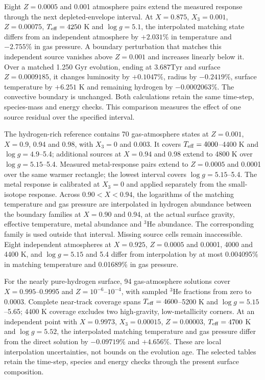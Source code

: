 \documentclass[11pt,letterpaper]{article}
\newcommand{\Tyr}{\mathrm{Tyr}}
\begin{document}
Eight $Z=0.0005$ and 0.001 atmosphere pairs extend the measured response
through the next depleted-envelope interval. At $X=0.875$, $X_3=0.001$,
$Z=0.00075$, $T_{\rm eff}=4250$ K and $\log g=5.1$, the interpolated
matching state differs from an independent atmosphere by $+2.031\%$ in
temperature and $-2.755\%$ in gas pressure. A boundary perturbation that
matches this independent source vanishes above $Z=0.001$ and increases
linearly below it. Over a matched 1.250 Gyr evolution, ending at
$3.687\Tyr$ and surface $Z=0.0009185$, it changes luminosity by
$+0.1047\%$, radius by $-0.2419\%$, surface temperature by $+6.251$ K
and remaining hydrogen by $-0.0002063\%$. The convective boundary is
unchanged. Both calculations retain the same time-step, species-mass and
energy checks. This comparison measures the effect of one source residual
over the specified interval.

The hydrogen-rich reference contains 70 gas-atmosphere states at
$Z=0.001$, $X=0.9$, 0.94 and 0.98, with $X_3=0$ and 0.003.
It covers $T_{\rm eff}=4000$--4400 K and $\log g=4.9$--5.4;
additional sources at $X=0.94$ and 0.98 extend to 4800 K over
$\log g=5.15$--5.4. Measured metal-response pairs extend to
$Z=0.0005$ and 0.0001 over the same warmer rectangle;
the lowest interval covers $\log g=5.15$--5.4. The metal response is
calibrated at $X_3=0$ and applied separately from the small-isotope response.
Across $0.90<X<0.94$, the logarithms of the matching temperature and gas
pressure are interpolated in hydrogen abundance between the boundary
families at $X=0.90$ and 0.94, at the actual surface gravity, effective
temperature, metal abundance and $^3$He abundance. The corresponding
family is used outside that interval. Missing source cells remain
inaccessible. Eight independent atmospheres
at $X=0.925$, $Z=0.0005$ and 0.0001, 4000 and 4400 K, and
$\log g=5.15$ and 5.4 differ from interpolation by at most 0.004095\%
in matching temperature and 0.01689\% in gas pressure.

For the nearly pure-hydrogen surface, 94 gas-atmosphere solutions cover
$X=0.995$--0.9995 and $Z=10^{-6}$--$10^{-4}$, with sampled
$^3$He fractions from zero to 0.0003. Complete near-track coverage spans
$T_{\rm eff}=4600$--5200 K and $\log g=5.15$--5.65;
4400 K coverage excludes two high-gravity, low-metallicity corners.
At an independent point with $X=0.9973$, $X_3=0.00015$, $Z=0.00003$,
$T_{\rm eff}=4700$ K and $\log g=5.52$, the interpolated matching
temperature and gas pressure differ from the direct solution by
$-0.09719\%$ and $+4.656\%$. These are local interpolation uncertainties,
not bounds on the evolution age. The selected tables retain the time-step,
species and energy checks through the present surface composition.
\end{document}
